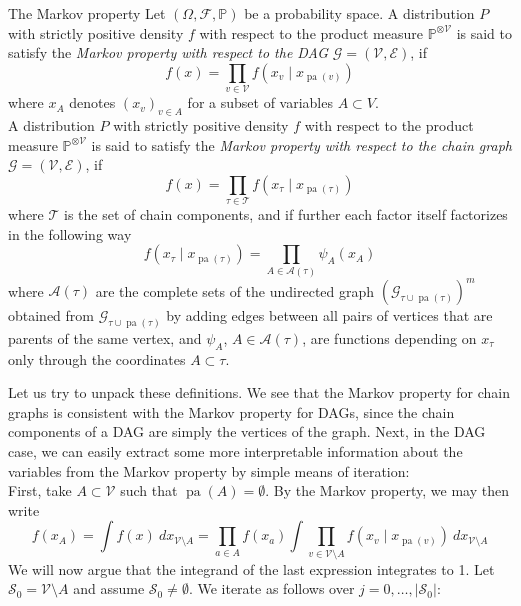\documentclass[11pt, a4paper]{memoir}
\theoremstyle{break}
\theoremstyle{break}
\theoremstyle{nonumberplain}
\newcommand{\mP}{\mathbb{P}}
\DeclareMathOperator{\pa}{pa}
\begin{document}
\begin{mydefinition}{The Markov property}
Let $(\Omega, \mathcal{F}, \mP)$ be a probability space. A distribution $P$ with strictly positive density $f$ with respect to the product measure $\mP^{\otimes \mathcal{V}}$ is said to satisfy the \emph{Markov property with respect to the DAG} $\mathcal{G}=(\mathcal{V}, \mathcal{E})$, if
\begin{equation}\label{MPDAG}
f(x)=\prod_{v\in \mathcal{V}}f\left(x_v\mid x_{\pa(v)}\right)
\end{equation}
where $x_A$ denotes $(x_v)_{v\in A}$ for a subset of variables $A\subset V$.\\[5pt]
A distribution $P$ with strictly positive density $f$ with respect to the product measure $\mP^{\otimes \mathcal{V}}$ is said to satisfy the \emph{Markov property with respect to the chain graph} $\mathcal{G}=(\mathcal{V}, \mathcal{E})$, if
\begin{equation}\label{MPCHAIN}
 f(x)=\prod_{\tau\in \mathscr{T}}f\left(x_\tau\mid x_{\pa(\tau)}\right)
\end{equation}
where $\mathscr{T}$ is the set of chain components, and if further each factor itself factorizes in the following way
$$f\left(x_\tau\mid x_{\pa(\tau)}\right)=\prod_{A\in \mathscr{A}(\tau)}\psi_A\left(x_A\right)$$
where $\mathscr{A}(\tau)$ are the complete sets of the undirected graph $\left(\mathcal{G}_{\tau\cup\pa(\tau)}\right)^m$ obtained from $\mathcal{G}_{\tau\cup\pa(\tau)}$ by adding edges between all pairs of vertices that are parents of the same vertex, and $\psi_A$, $A\in \mathscr{A}(\tau)$, are functions depending on $x_\tau$ only through the coordinates $A\subset \tau$. 
\end{mydefinition}
Let us try to unpack these definitions. We see that the Markov property for chain graphs is consistent with the Markov property for DAGs, since the chain components of a DAG are simply the vertices of the graph. Next, in the DAG case, we can easily extract some more interpretable information about the variables from the Markov property by simple means of iteration:\\[5pt]
First, take $A\subset \mathcal{V}$ such that $\pa(A)=\emptyset$. By the Markov property, we may then write
$$f(x_A)=\int f(x)\ dx_{\mathcal{V}\setminus A}=\prod_{a\in A}f(x_a)\int\prod_{v\in \mathcal{V}\setminus A} f\left(x_v\mid x_{\pa(v)}\right)\ dx_{\mathcal{V}\setminus A}$$
We will now argue that the integrand of the last expression integrates to 1. Let $\mathcal{S}_0=\mathcal{V}\setminus A$ and assume $\mathcal{S}_0\neq\emptyset$. We iterate as follows over $j=0,\ldots,\left|\mathcal{S}_0\right|$:
\end{document}
